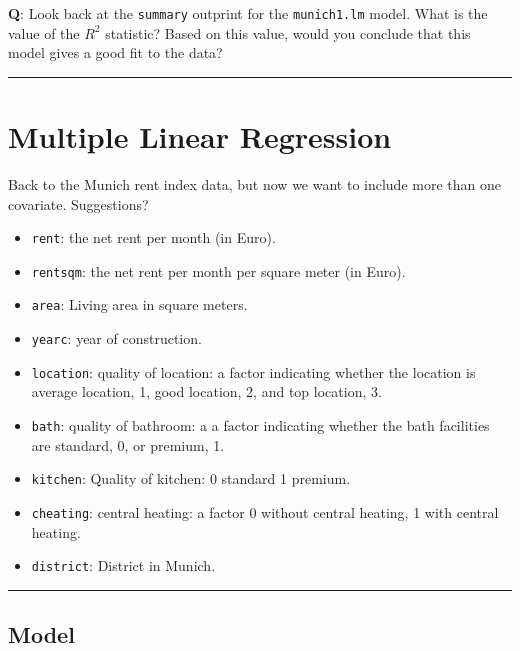 \documentclass[]{article}
\providecommand{\tightlist}{%
  \setlength{\itemsep}{0pt}\setlength{\parskip}{0pt}}
\begin{document}
\textbf{Q}: Look back at the \texttt{summary} outprint for the
\texttt{munich1.lm} model. What is the value of the \(R^2\) statistic?
Based on this value, would you conclude that this model gives a good fit
to the data?

\begin{center}\rule{0.5\linewidth}{\linethickness}\end{center}

\hypertarget{multiple-linear-regression}{%
\section{Multiple Linear Regression}\label{multiple-linear-regression}}

Back to the Munich rent index data, but now we want to include more than
one covariate. Suggestions?

\begin{itemize}
\tightlist
\item
  \texttt{rent}: the net rent per month (in Euro).
\item
  \texttt{rentsqm}: the net rent per month per square meter (in Euro).
\item
  \texttt{area}: Living area in square meters.
\item
  \texttt{yearc}: year of construction.
\item
  \texttt{location}: quality of location: a factor indicating whether
  the location is average location, 1, good location, 2, and top
  location, 3.
\item
  \texttt{bath}: quality of bathroom: a a factor indicating whether the
  bath facilities are standard, 0, or premium, 1.
\item
  \texttt{kitchen}: Quality of kitchen: 0 standard 1 premium.
\item
  \texttt{cheating}: central heating: a factor 0 without central
  heating, 1 with central heating.
\item
  \texttt{district}: District in Munich.
\end{itemize}

\begin{center}\rule{0.5\linewidth}{\linethickness}\end{center}

\hypertarget{model}{%
\subsection{Model}\label{model}}
\end{document}
